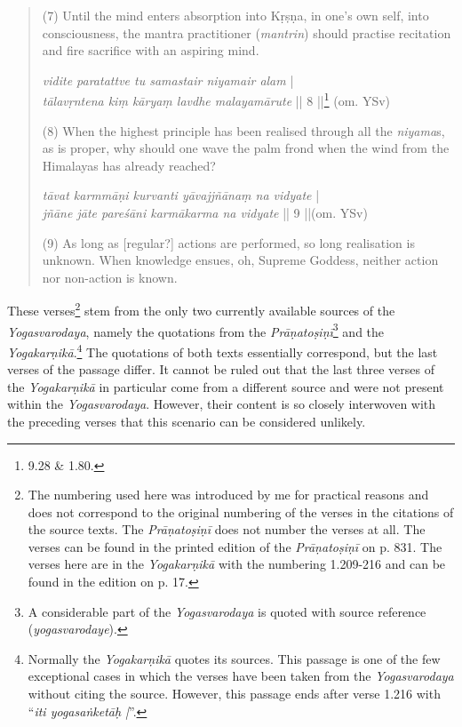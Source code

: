 \begin{quote}
(7) Until the mind enters absorption into Kṛṣṇa, in one's own self, into consciousness,
the mantra practitioner (\textit{mantrin}) should practise recitation and fire sacrifice with an aspiring mind. 

\textit{vidite paratattve tu samastair niyamair alam} |\\
\textit{tālavṛntena kiṃ kāryaṃ lavdhe malayamārute} || 8 ||\footnote{\approx {} 9.28 \&  1.80.} (om. YSv) 

(8) When the highest principle has been realised through all the \textit {niyama}s, as is proper,
why should one wave the palm frond when the wind from the Himalayas has already reached?

\textit{tāvat karmmāṇi kurvanti yāvajjñānaṃ na vidyate} |\\ 
\textit{jñāne jāte pareśāni karmākarma na vidyate} || 9 ||(om. YSv) 

(9) As long as [regular?] actions are performed, so long realisation is unknown.
When knowledge ensues, oh, Supreme Goddess, neither action nor non-action is known.
\end{quote}

These verses\footnote{The numbering used here was introduced by me for practical reasons and does not correspond to the original numbering of the verses in the citations of the source texts. The \textit{Prāṇatoṣiṇī} does not number the verses at all. The verses can be found in the printed edition of the \textit{Prāṇatoṣiṇī} on p. 831. The verses here are in the \textit{Yogakarṇikā} with the numbering 1.209-216 and can be found in the edition on p. 17.} stem from the only two currently available sources of the \textit{Yogasvarodaya}, namely the quotations from the \textit{Prāṇatoṣiṇī}\footnote{A considerable part of the \textit{Yogasvarodaya} is quoted with source reference (\textit{yogasvarodaye}).} and the \textit{Yogakarṇikā}.\footnote{Normally the \textit{Yogakarṇikā} quotes its sources. This passage is one of the few exceptional cases in which the verses have been taken from the \textit{Yogasvarodaya} without citing the source. However, this passage ends after verse 1.216 with ``\textit{iti yogasaṅketāḥ |}''.} The quotations of both texts essentially correspond, but the last verses of the passage differ. It cannot be ruled out that the last three verses of the \textit{Yogakarṇikā} in particular come from a different source and were not present within the \textit{Yogasvarodaya}. However, their content is so closely interwoven with the preceding verses that this scenario can be considered unlikely.

